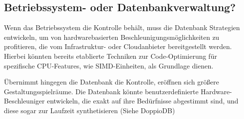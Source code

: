 \documentclass[conference]{IEEEtran}
\begin{document}
\subsection{Betriebssystem- oder Datenbankverwaltung?}

Wenn das Betriebssystem die Kontrolle behält, muss die Datenbank Strategien entwickeln, um von hardwarebasierten Beschleunigungsmöglichkeiten zu profitieren,
die vom Infrastruktur- oder Cloudanbieter bereitgestellt werden. Hierbei könnten bereits etablierte Techniken zur Code-Optimierung für spezifische CPU-Features,
wie SIMD-Einheiten, als Grundlage dienen.

Übernimmt hingegen die Datenbank die Kontrolle, eröffnen sich größere Gestaltungsspielräume. Die Datenbank könnte benutzerdefinierte Hardware-Beschleuniger entwickeln,
die exakt auf ihre Bedürfnisse abgestimmt sind, und diese sogar zur Laufzeit synthetisieren (Siehe DoppioDB)







\end{document}
